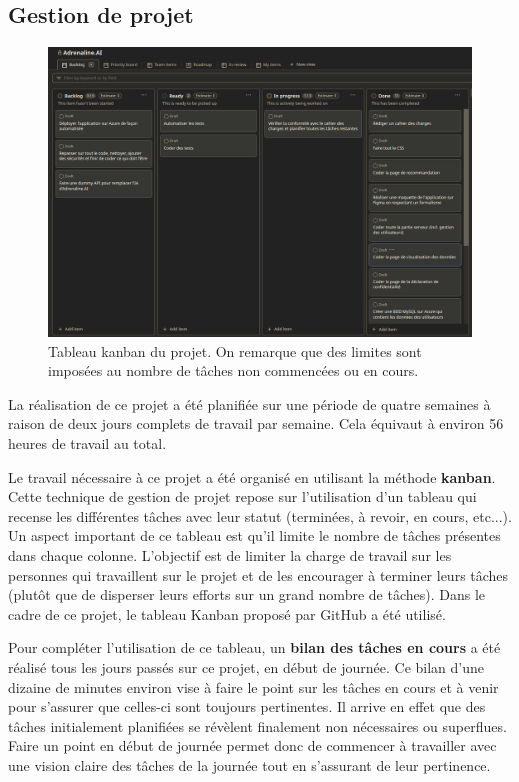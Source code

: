 \documentclass[french]{article}
\begin{document}
    \subsection{Gestion de projet}
    \begin{figure}[h!]
        \includegraphics[width=12cm]{kanban}
        \centering
        \caption{Tableau kanban du projet. On remarque que des limites sont imposées au nombre de tâches non commencées ou en cours.}
        \centering
    \end{figure}

    La réalisation de ce projet a été planifiée sur une période de quatre semaines à raison de deux jours complets de travail par semaine. Cela équivaut à environ 56 heures de travail au total.

    Le travail nécessaire à ce projet a été organisé en utilisant la méthode \textbf{kanban}. Cette technique de gestion de projet repose sur l'utilisation d'un tableau qui recense les différentes tâches avec leur statut (terminées, à revoir, en cours, etc...). Un aspect important de ce tableau est qu'il limite le nombre de tâches présentes dans chaque colonne. L'objectif est de limiter la charge de travail sur les personnes qui travaillent sur le projet et de les encourager à terminer leurs tâches (plutôt que de disperser leurs efforts sur un grand nombre de tâches). Dans le cadre de ce projet, le tableau Kanban proposé par GitHub a été utilisé.

    Pour compléter l'utilisation de ce tableau, un \textbf{bilan des tâches en cours} a été réalisé tous les jours passés sur ce projet, en début de journée. Ce bilan d'une dizaine de minutes environ vise à faire le point sur les tâches en cours et à venir pour s'assurer que celles-ci sont toujours pertinentes. Il arrive en effet que des tâches initialement planifiées se révèlent finalement non nécessaires ou superflues. Faire un point en début de journée permet donc de commencer à travailler avec une vision claire des tâches de la journée tout en s'assurant de leur pertinence.
\end{document}
